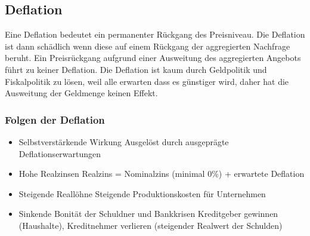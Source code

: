 \subsection{Deflation}
Eine Deflation bedeutet ein permanenter Rückgang des Preisniveau. 
Die Deflation ist dann schädlich wenn diese auf einem Rückgang der aggregierten Nachfrage beruht. Ein Preisrückgang aufgrund einer Ausweitung des aggregierten Angebots führt zu keiner Deflation. Die Deflation ist kaum durch Geldpolitik und Fiskalpolitik zu lösen, weil alle erwarten dass es günstiger wird, daher hat die Ausweitung der Geldmenge keinen Effekt.
\vspace{-0.5cm}
\subsubsection{Folgen der Deflation}
\begin{itemize}
    \item Selbstverstärkende Wirkung
    \subitem Ausgelöst durch ausgeprägte Deflationserwartungen
    \item Hohe Realzinsen
    \subitem Realzins = Nominalzins (minimal 0\%) + erwartete Deflation
    \item Steigende Reallöhne
    \subitem Steigende Produktionskosten für Unternehmen
    \item Sinkende Bonität der Schuldner und Bankkrisen
    \subitem Kreditgeber gewinnen (Haushalte), Kreditnehmer verlieren
    (steigender Realwert der Schulden)
\end{itemize}

\clearpage
\pagebreak